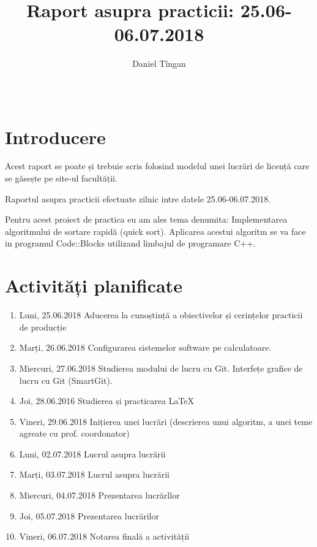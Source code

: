 \documentclass{report}
\title{{\sc Raport asupra practicii: 25.06-06.07.2018}}
\author{Daniel Tîngan}
\date{\,}
\begin{document}
\maketitle

\tableofcontents

\chapter{Introducere}

Acest raport se poate și trebuie scris folosind modelul unei lucrări de licență care se găsește pe site-ul facultății. 

\vskip 0.5cm

Raportul asupra practicii efectuate zilnic intre datele 25.06-06.07.2018. 

\vskip 1cm

Pentru acest proiect de practica eu am ales tema denumita: Implementarea algoritmului de sortare rapidă (quick sort).
Aplicarea acestui algoritm se va face in programul Code::Blocks utilizand limbajul de programare C++.

\chapter{Activități planificate}
\begin{enumerate}
\item  Luni, 25.06.2018 \newline
Aducerea la cunoștință a obiectivelor și cerințelor practicii de producție
\item  Marți, 26.06.2018 \newline
Configurarea sistemelor software pe calculatoare. 
\item  Miercuri, 27.06.2018 \newline
Studierea modului de lucru cu Git. Interfețe grafice de lucru cu Git (SmartGit).
\item  Joi, 28.06.2016 \newline
Studierea și practicarea LaTeX
\item  Vineri, 29.06.2018  \newline
Inițierea unei lucrări (descrierea unui algoritm, a unei teme agreate cu prof. coordonator)
\item  Luni, 02.07.2018  \newline
Lucrul asupra lucrării
\item  Marți, 03.07.2018  \newline
Lucrul asupra lucrării
\item  Miercuri, 04.07.2018  \newline
Prezentarea lucrărllor
\item  Joi, 05.07.2018  \newline
Prezentarea lucrărilor
\item  Vineri, 06.07.2018  \newline
Notarea finală a activității
\end{enumerate}
\end{document}
